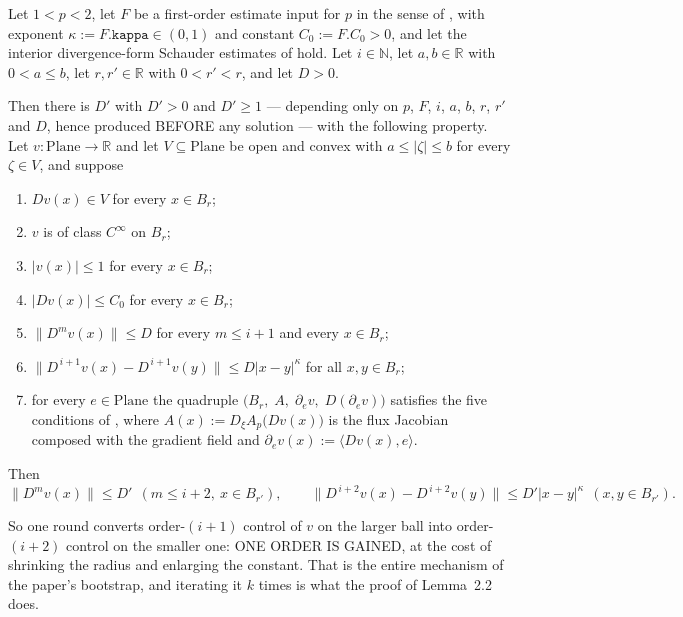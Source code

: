 \begin{lemma}
Let $1<p<2$, let $F$ be a first-order estimate input for $p$ in the sense of
, with exponent $\kappa:=F.\mathtt{kappa}\in(0,1)$ and constant
$C_0:=F.C_0>0$, and let the interior divergence-form Schauder estimates of
 hold.  Let $i\in\mathbb{N}$, let $a,b\in\mathbb{R}$ with
$0<a\le b$, let $r,r'\in\mathbb{R}$ with $0<r'<r$, and let $D>0$.

Then there is $D'$ with $D'>0$ and $D'\ge1$ --- depending only on $p$, $F$, $i$, $a$, $b$, $r$,
$r'$ and $D$, hence produced BEFORE any solution --- with the following property.  Let
$v\colon\mathrm{Plane}\to\mathbb{R}$ and let $V\subseteq\mathrm{Plane}$ be open and convex with
$a\le\lvert\zeta\rvert\le b$ for every $\zeta\in V$, and suppose
\begin{enumerate}
\item[(H1)] $Dv(x)\in V$ for every $x\in B_r$;
\item[(H2)] $v$ is of class $C^{\infty}$ on $B_r$;
\item[(H3)] $\lvert v(x)\rvert\le1$ for every $x\in B_r$;
\item[(H4)] $\lvert Dv(x)\rvert\le C_0$ for every $x\in B_r$;
\item[(H5)] $\bigl\lVert D^{m}v(x)\bigr\rVert\le D$ for every $m\le i+1$ and every $x\in B_r$;
\item[(H6)] $\bigl\lVert D^{\,i+1}v(x)-D^{\,i+1}v(y)\bigr\rVert\le D\lvert x-y\rvert^{\kappa}$
  for all $x,y\in B_r$;
\item[(H7)] for every $e\in\mathrm{Plane}$ the quadruple
  $\bigl(B_r,\;A,\;\partial_ev,\;D(\partial_ev)\bigr)$ satisfies the five conditions of
  , where $A(x):=D_\xi A_p\bigl(Dv(x)\bigr)$ is the flux Jacobian
  composed with the gradient field and $\partial_ev(x):=\langle Dv(x),e\rangle$.
\end{enumerate}
Then
\[
  \bigl\lVert D^{m}v(x)\bigr\rVert\le D'\ \ (m\le i+2,\ x\in B_{r'}),
  \qquad
  \bigl\lVert D^{\,i+2}v(x)-D^{\,i+2}v(y)\bigr\rVert\le D'\lvert x-y\rvert^{\kappa}
  \ \ (x,y\in B_{r'}).
\]

So one round converts order-$(i+1)$ control of $v$ on the larger ball into order-$(i+2)$ control
on the smaller one: ONE ORDER IS GAINED, at the cost of shrinking the radius and enlarging the
constant.  That is the entire mechanism of the paper's bootstrap, and iterating it $k$ times is
what the proof of Lemma~2.2 does.


\end{lemma}
